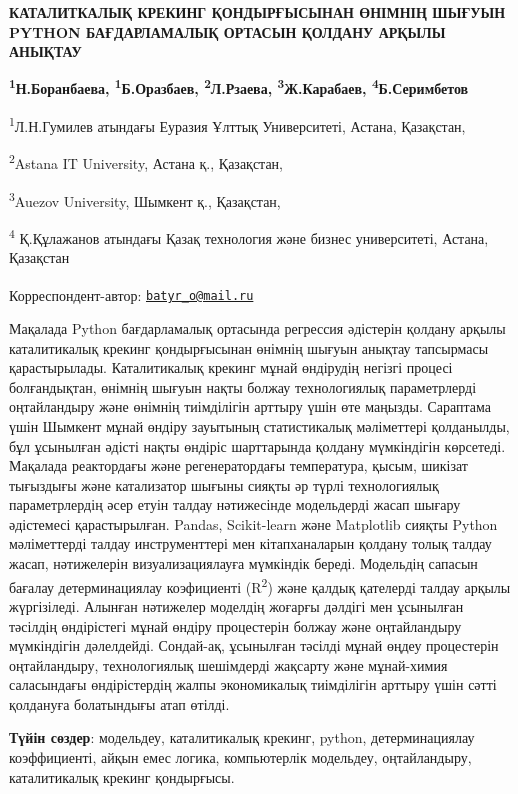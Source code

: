 
{\bfseries КАТАЛИТКАЛЫҚ КРЕКИНГ ҚОНДЫРҒЫСЫНАН ӨНІМНІҢ ШЫҒУЫН PYTHON
БАҒДАРЛАМАЛЫҚ ОРТАСЫН ҚОЛДАНУ АРҚЫЛЫ АНЫҚТАУ}

{\bfseries \textsuperscript{1}Н.Боранбаева,
\textsuperscript{1}Б.Оразбаев\textsuperscript{\envelope },
\textsuperscript{2}Л.Рзаева, \textsuperscript{3}Ж.Карабаев,
\textsuperscript{4}Б.Серимбетов}

\textsuperscript{1}Л.Н.Гумилев атындағы Еуразия Ұлттық Университеті,
Астана, Қазақстан,

\textsuperscript{2}Astana IT University, Астана қ., Қазақстан,

\textsuperscript{3}Auezov University, Шымкент қ., Қазақстан,

\textsuperscript{4} Қ.Құлажанов атындағы Қазақ технология және бизнес
университеті, Астана, Қазақстан

\raggedright {\bfseries \textsuperscript{\envelope }}Корреспондент-автор: \href{mailto:batyr_o@mail.ru}{\nolinkurl{batyr\_o@mail.ru}}

Мақалада Python бағдарламалық ортасында регрессия әдістерін қолдану
арқылы каталитикалық крекинг қондырғысынан өнімнің шығуын анықтау
тапсырмасы қарастырылады. Каталитикалық крекинг мұнай өндірудің негізгі
процесі болғандықтан, өнімнің шығуын нақты болжау технологиялық
параметрлерді оңтайландыру және өнімнің тиімділігін арттыру үшін өте
маңызды. Сараптама үшін Шымкент мұнай өндіру зауытының статистикалық
мәліметтері қолданылды, бұл ұсынылған әдісті нақты өндіріс шарттарында
қолдану мүмкіндігін көрсетеді. Мақалада реактордағы және регенератордағы
температура, қысым, шикізат тығыздығы және катализатор шығыны сияқты әр
түрлі технологиялық параметрлердің әсер етуін талдау нәтижесінде
модельдерді жасап шығару әдістемесі қарастырылған. Pandas, Scikit-learn
және Matplotlib сияқты Python мәліметтерді талдау инструменттері мен
кітапханаларын қолдану толық талдау жасап, нәтижелерін визуализациялауға
мүмкіндік береді. Модельдің сапасын бағалау детерминациялау коэфициенті
(R\textsuperscript{2}) және қалдық қателерді талдау арқылы жүргізіледі.
Алынған нәтижелер моделдің жоғарғы дәлдігі мен ұсынылған тәсілдің
өндірістегі мұнай өндіру процестерін болжау және оңтайландыру
мүмкіндігін дәлелдейді. Сондай-ақ, ұсынылған тәсілді мұнай өңдеу
процестерін оңтайландыру, технологиялық шешімдерді жақсарту және
мұнай-химия саласындағы өндірістердің жалпы экономикалық тиімділігін
арттыру үшін сәтті қолдануға болатындығы атап өтілді.

{\bfseries Түйін сөздер}: модельдеу, каталитикалық крекинг, python,
детерминациялау коэффициенті, айқын емес логика, компьютерлік модельдеу,
оңтайландыру, каталитикалық крекинг қондырғысы.

